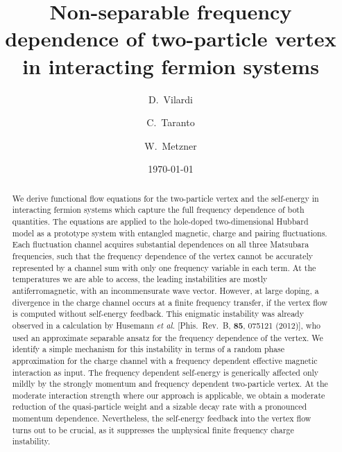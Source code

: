 \documentclass[aps,prb,twocolumn,showpacs,groupedaddress]{revtex4-1}
\begin{document}
\title{Non-separable frequency dependence of two-particle vertex \\ 
        in interacting fermion systems}

\author {D.~Vilardi}
\author{C.~Taranto}
\author{W.~Metzner}

\date{\today}

\begin{abstract}
We derive functional flow equations for the two-particle vertex and the self-energy in interacting fermion systems which capture the full frequency dependence of both quantities. The equations are applied to the hole-doped two-dimensional Hubbard model as a prototype system with entangled magnetic, charge and pairing fluctuations. Each fluctuation channel acquires substantial dependences on all three Matsubara frequencies, such that the frequency dependence of the vertex cannot be accurately represented by a channel sum with only one frequency variable in each term. At the temperatures we are able to access, the leading instabilities are mostly antiferromagnetic, with an incommensurate wave vector. However, at large doping, a divergence in the charge channel occurs at a finite frequency transfer, if the vertex flow is computed without self-energy feedback. This enigmatic instability was already observed in a calculation by Husemann \emph{et al.} [Phis.~Rev.~B, \textbf{85}, 075121 (2012)], who used an approximate separable ansatz for the frequency dependence of the vertex. We identify a simple mechanism for this instability in terms of a random phase approximation for the charge channel with a frequency dependent effective magnetic interaction as input.
The frequency dependent self-energy is generically affected only mildly by the strongly momentum and frequency dependent two-particle vertex. At the moderate interaction strength where our approach is applicable, we obtain a moderate reduction of the quasi-particle weight and a sizable decay rate with a pronounced momentum dependence. Nevertheless, the self-energy feedback into the vertex flow turns out to be crucial, as it suppresses the unphysical finite frequency charge instability.
\end{abstract}

\pacs{}
\maketitle
\end{document}
